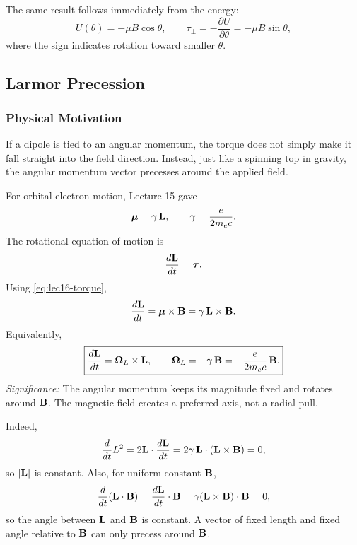 The same result follows immediately from the energy:
\begin{equation}\label{eq:lec16-energy-angle}
  U(\theta)=-\mu B\cos\theta,
  \qquad
  \tau_\perp=-\frac{\partial U}{\partial\theta}
  =-\mu B\sin\theta,
\end{equation}
where the sign indicates rotation toward smaller $\theta$.

\subsection{Larmor Precession}\label{subsec:lec16-larmor}

\subsubsection*{Physical Motivation}
If a dipole is tied to an angular momentum, the torque does not simply make it fall
straight into the field direction.  Instead, just like a spinning top in gravity, the
angular momentum vector precesses around the applied field.

For orbital electron motion, Lecture 15 gave
\begin{equation}\label{eq:lec16-mu-L}
  \boldsymbol{\mu}=\gamma\,\mathbf{L},
  \qquad
  \gamma=\frac{e}{2m_ec}.
\end{equation}
The rotational equation of motion is
\begin{equation}\label{eq:lec16-dLdt}
  \frac{d\mathbf{L}}{dt}=\boldsymbol{\tau}.
\end{equation}
Using \eqref{eq:lec16-torque},
\begin{equation}\label{eq:lec16-Larmor-equation}
  \frac{d\mathbf{L}}{dt}
  =\boldsymbol{\mu}\times\mathbf{B}
  =\gamma\,\mathbf{L}\times\mathbf{B}.
\end{equation}
Equivalently,
\begin{equation}\label{eq:lec16-Larmor-box}
  \boxed{
    \frac{d\mathbf{L}}{dt}
    =\boldsymbol{\Omega}_L\times\mathbf{L},
    \qquad
    \boldsymbol{\Omega}_L=-\gamma\,\mathbf{B}
    =-\frac{e}{2m_ec}\,\mathbf{B} .
  }
\end{equation}
\textit{Significance:} The angular momentum keeps its magnitude fixed and rotates
around $\mathbf{B}$.  The magnetic field creates a preferred axis, not a radial pull.

Indeed,
\begin{equation}\label{eq:lec16-L-magnitude}
  \frac{d}{dt}L^2
  =2\mathbf{L}\cdot\frac{d\mathbf{L}}{dt}
  =2\gamma\,\mathbf{L}\cdot(\mathbf{L}\times\mathbf{B})=0,
\end{equation}
so $|\mathbf{L}|$ is constant.  Also, for uniform constant $\mathbf{B}$,
\begin{equation}\label{eq:lec16-L-dot-B}
  \frac{d}{dt}(\mathbf{L}\cdot\mathbf{B})
  =\frac{d\mathbf{L}}{dt}\cdot\mathbf{B}
  =\gamma(\mathbf{L}\times\mathbf{B})\cdot\mathbf{B}=0,
\end{equation}
so the angle between $\mathbf{L}$ and $\mathbf{B}$ is constant.  A vector of fixed length and
fixed angle relative to $\mathbf{B}$ can only precess around $\mathbf{B}$.


